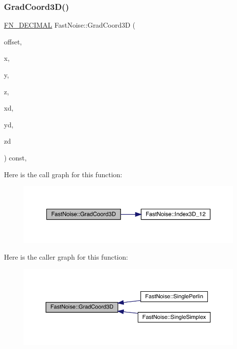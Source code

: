 \subsubsection{\texorpdfstring{Grad\+Coord3\+D()}{GradCoord3D()}}
{\footnotesize\ttfamily \mbox{\hyperlink{_fast_noise_8h_a75a9ef6d2541c4921815b885bfd449c3}{F\+N\+\_\+\+D\+E\+C\+I\+M\+AL}} Fast\+Noise\+::\+Grad\+Coord3D (\begin{DoxyParamCaption}\item[{unsigned char}]{offset,  }\item[{int}]{x,  }\item[{int}]{y,  }\item[{int}]{z,  }\item[{\mbox{\hyperlink{_fast_noise_8h_a75a9ef6d2541c4921815b885bfd449c3}{F\+N\+\_\+\+D\+E\+C\+I\+M\+AL}}}]{xd,  }\item[{\mbox{\hyperlink{_fast_noise_8h_a75a9ef6d2541c4921815b885bfd449c3}{F\+N\+\_\+\+D\+E\+C\+I\+M\+AL}}}]{yd,  }\item[{\mbox{\hyperlink{_fast_noise_8h_a75a9ef6d2541c4921815b885bfd449c3}{F\+N\+\_\+\+D\+E\+C\+I\+M\+AL}}}]{zd }\end{DoxyParamCaption}) const\hspace{0.3cm}{\ttfamily [inline]}, {\ttfamily [private]}}

Here is the call graph for this function\+:
\nopagebreak
\begin{figure}[H]
\begin{center}
\leavevmode
\includegraphics[width=350pt]{class_fast_noise_a96bc7b4cc9a84cec68c16bf6dfce4f53_cgraph}
\end{center}
\end{figure}
Here is the caller graph for this function\+:
\nopagebreak
\begin{figure}[H]
\begin{center}
\leavevmode
\includegraphics[width=350pt]{class_fast_noise_a96bc7b4cc9a84cec68c16bf6dfce4f53_icgraph}
\end{center}
\end{figure}
\mbox{\label{class_fast_noise_a96464d203e3868b31bcd9248f32ae259}} 

